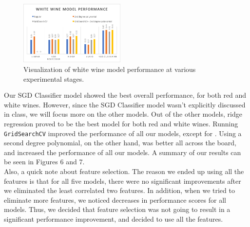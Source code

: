   \begin{figure}[htb]

  \centering  %

  \includegraphics[width=0.47\textwidth]{whitewine_score.png}

  \caption{Visualization of white wine model performance at various experimental stages.}

  \label{fig:tex}

  \end{figure}
 

  
Our SGD Classifier model showed the best overall performance, for both red and white wines. However, since the SGD Classifier model wasn't explicitly discussed in class, we will focus more on the other models. Out of the other models, ridge regression proved to be the best model for both red and white wines. Running \texttt{GridSearchCV} improved the performance of all our models, except for . Using a second degree polynomial, on the other hand, was better all across the board, and increased the performance of all our models. A summary of our results can be seen in Figures 6 and 7.\\

Also, a quick note about feature selection. The reason we ended up using all the features is that for all five models, there were no significant improvements after we eliminated the least correlated two features. In addition, when we tried to eliminate more features, we noticed decreases in performance scores for all models. Thus, we decided that feature selection was not going to result in a significant performance improvement, and decided to use all the features.\\

